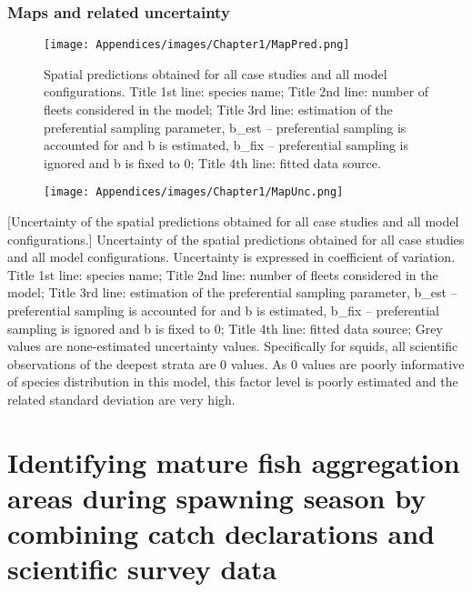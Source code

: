 \newpage

\subsection{Maps and related uncertainty}\label{appendix:MapPredUnc}

\begin{figure}[H]
   \begin{center}
      \texttt{[image: Appendices/images/Chapter1/MapPred.png]}
   \end{center}
   \caption[Spatial predictions obtained for all case studies and all model configurations.]
   {Spatial predictions obtained for all case studies and all model configurations. Title 1st line: species name; Title 2nd line: number of fleets considered in the model; Title 3rd line: estimation of the preferential sampling parameter, b_est – preferential sampling is accounted for and b is estimated, b_fix – preferential sampling is ignored and b is fixed to 0; Title 4th line: fitted data source.}
   \label{fig:MapPred}
\end{figure}


\begin{figure}[H]
   \begin{center}
      \texttt{[image: Appendices/images/Chapter1/MapUnc.png]}
   \end{center}
   \label{fig:MapUnc}
\end{figure}

[Uncertainty of the spatial predictions obtained for all case studies and all model configurations.]
   {Uncertainty of the spatial predictions obtained for all case studies and all model configurations. Uncertainty is expressed in coefficient of variation. Title 1st line: species name; Title 2nd line: number of fleets considered in the model; Title 3rd line: estimation of the preferential sampling parameter, b_est – preferential sampling is accounted for and b is estimated, b_fix – preferential sampling is ignored and b is fixed to 0; Title 4th line: fitted data source; Grey values are none-estimated uncertainty values. Specifically for squids, all scientific observations of the deepest strata are 0 values. As 0 values are poorly informative of species distribution in this model, this factor level is poorly estimated and the related standard deviation are very high.}

\newpage

\chapter{Identifying mature fish aggregation areas during spawning season by combining catch declarations and scientific survey data}\label{appendix:Chap2}

